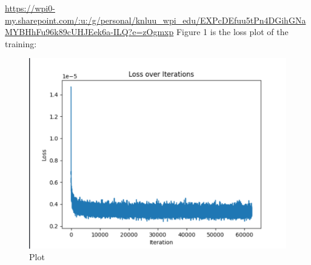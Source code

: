 \documentclass[conference]{IEEEtran}
\begin{document}
\urldef{\linearcheckpoint}\url{https://wpi0-my.sharepoint.com/:u:/g/personal/knluu_wpi_edu/EXPcDEfuu5tPn4DGihGNaMYBHhFu96k89cUHJEek6a-ILQ?e=zOgmxp}
\linearcheckpoint{


}
Figure 1 is the loss plot of the training:
\begin{figure}[!h]
  \centering
  \includegraphics[scale=0.2]{./images/linearloss.png}
  \caption{Plot}
\end{figure} 
\end{document}

